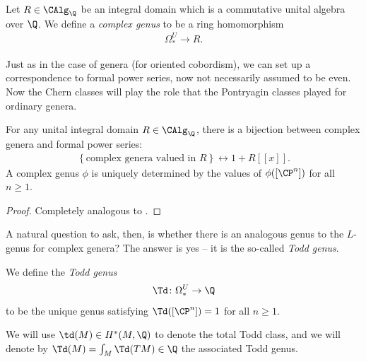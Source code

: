 \documentclass[11pt]{book}
\begin{document}
\begin{definition}\label{def:complex-genera}
Let $R\in \CAlg_\Q$ be an integral domain which is a commutative unital algebra over $\Q$. We define a \emph{complex genus} to be a ring homomorphism
\begin{align*}
    \Omega^U_\ast \to R.
\end{align*}
\end{definition}

Just as in the case of genera (for oriented cobordism), we can set up a correspondence to formal power series, now not necessarily assumed to be even. Now the Chern classes will play the role that the Pontryagin classes played for ordinary genera.

\begin{theorem}\label{thm:complex-genera} For any unital integral domain $R\in\CAlg_\Q$, there is a bijection between complex genera and formal power series:
\begin{align*}
    \left\{ \text{complex genera valued in }R \right\} \leftrightarrow 1 + R[[x]].
\end{align*}
A complex genus $\phi$ is uniquely determined by the values of $\phi([\CP^n])$ for all $n\ge1$.
\end{theorem}
\begin{proof} Completely analogous to .
\end{proof}

A natural question to ask, then, is whether there is an analogous genus to the $L$-genus for complex genera? The answer is yes -- it is the so-called \emph{Todd genus}.

\begin{definition}\label{def:Todd-genus} We define the \emph{Todd genus}
\begin{align*}
    \Td \colon \Omega^U_\ast \to \Q
\end{align*}
to be the unique genus satisfying $\Td([\CP^n]) = 1$ for all $n\ge1$.
\end{definition}

\begin{notation} We will use $\td(M) \in H^\ast(M,\Q)$ to denote the total Todd class, and we will denote by $\Td(M) = \int_M \Td(TM)\in \Q$ the associated Todd genus.
\end{notation}
\end{document}

